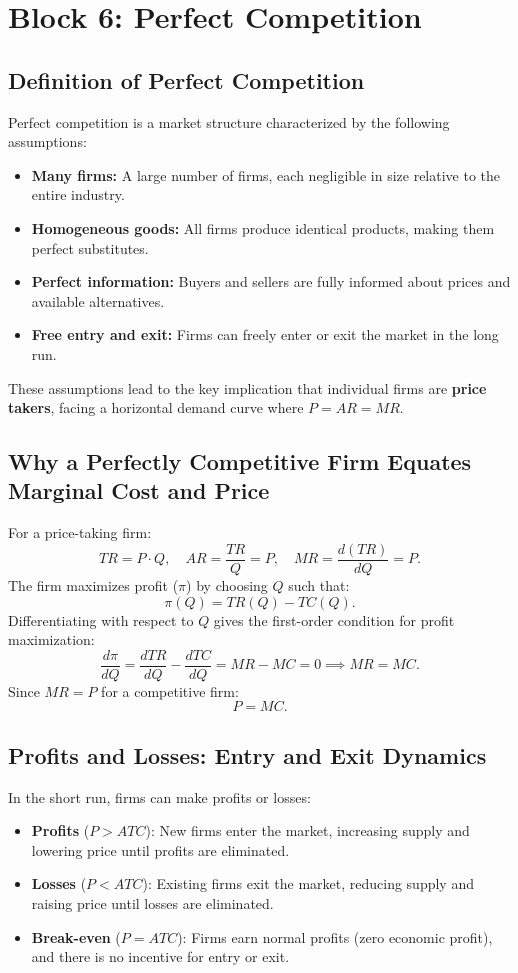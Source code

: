 \chapter*{Block 6: Perfect Competition}

\section*{Definition of Perfect Competition}
Perfect competition is a market structure characterized by the following assumptions:
\begin{itemize}
    \item \textbf{Many firms:} A large number of firms, each negligible in size relative to the entire industry.
    \item \textbf{Homogeneous goods:} All firms produce identical products, making them perfect substitutes.
    \item \textbf{Perfect information:} Buyers and sellers are fully informed about prices and available alternatives.
    \item \textbf{Free entry and exit:} Firms can freely enter or exit the market in the long run.
\end{itemize}
These assumptions lead to the key implication that individual firms are \textbf{price takers}, facing a horizontal demand curve where \(P = AR = MR\).

\section*{Why a Perfectly Competitive Firm Equates Marginal Cost and Price}
For a price-taking firm:
\[
TR = P \cdot Q, \quad AR = \frac{TR}{Q} = P, \quad MR = \frac{d(TR)}{dQ} = P.
\]
The firm maximizes profit (\(\pi\)) by choosing \(Q\) such that:
\[
\pi(Q) = TR(Q) - TC(Q).
\]
Differentiating with respect to \(Q\) gives the first-order condition for profit maximization:
\[
\frac{d\pi}{dQ} = \frac{dTR}{dQ} - \frac{dTC}{dQ} = MR - MC = 0 \implies MR = MC.
\]
Since \(MR = P\) for a competitive firm:
\[
P = MC.
\]

\section*{Profits and Losses: Entry and Exit Dynamics}
In the short run, firms can make profits or losses:
\begin{itemize}
    \item \textbf{Profits} (\(P > ATC\)): New firms enter the market, increasing supply and lowering price until profits are eliminated.
    \item \textbf{Losses} (\(P < ATC\)): Existing firms exit the market, reducing supply and raising price until losses are eliminated.
    \item \textbf{Break-even} (\(P = ATC\)): Firms earn normal profits (zero economic profit), and there is no incentive for entry or exit.
\end{itemize}

